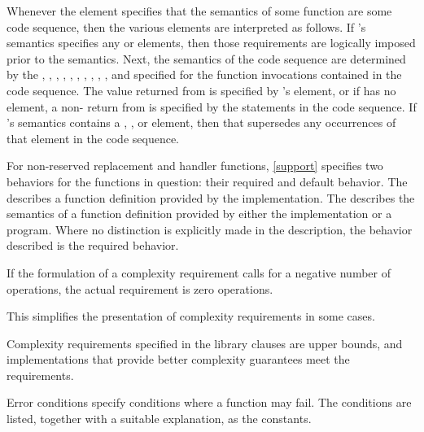 \pnum
Whenever the  element specifies that the semantics of some function
 are  some code sequence, then the various elements are
interpreted as follows.
If 's semantics specifies any  or  elements,
then those requirements are logically imposed prior to the  semantics.
Next, the semantics of the code sequence are determined by the
, , , ,
, , , ,
, , and 
specified for the function invocations contained in the code sequence.
The value returned from  is specified by 's  element,
or if  has no  element,
a non- return from  is specified by the
 statements in the code sequence.
If 's semantics contains a ,
, or  element,
then that supersedes any occurrences of that element in the code sequence.

\pnum
For non-reserved replacement and handler functions,
\ref{support} specifies two behaviors for the functions in question:
their required and default behavior.
The 
describes a function definition provided by the implementation.
The 
describes the semantics of a function definition provided by
either the implementation or a \Cpp{} program.
Where no distinction is explicitly made in the description, the
behavior described is the required behavior.

\pnum
If the formulation of a complexity requirement calls for a negative number of
operations, the actual requirement is zero operations.
\begin{footnote}
This simplifies
the presentation of complexity requirements in some cases.
\end{footnote}

\pnum
Complexity requirements specified in the library clauses are upper bounds,
and implementations that provide better complexity guarantees meet
the requirements.

\pnum
Error conditions specify conditions where a function may fail. The conditions
are listed, together with a suitable explanation, as the 
constants.

